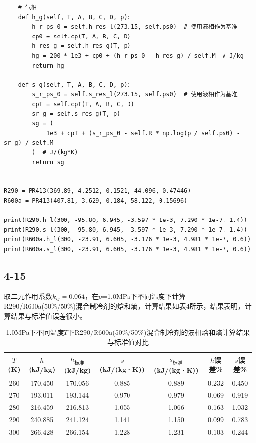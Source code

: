 \documentclass[12pt,a4paper]{article}
\begin{document}
\begin{lstlisting}
    # 气相
    def h_g(self, T, A, B, C, D, p):
        h_r_ps_0 = self.h_res_l(273.15, self.ps0)  # 使用液相作为基准
        cp0 = self.cp(T, A, B, C, D)
        h_res_g = self.h_res_g(T, p)
        hg = 200 * 1e3 + cp0 + (h_r_ps_0 - h_res_g) / self.M  # J/kg
        return hg

    def s_g(self, T, A, B, C, D, p):
        s_r_ps_0 = self.s_res_l(273.15, self.ps0)  # 使用液相作为基准
        cpT = self.cpT(T, A, B, C, D)
        sr_g = self.s_res_g(T, p)
        sg = (
            1e3 + cpT + (s_r_ps_0 - self.R * np.log(p / self.ps0) - sr_g) / self.M
        )  # J/(kg*K)
        return sg


R290 = PR413(369.89, 4.2512, 0.1521, 44.096, 0.47446)
R600a = PR413(407.81, 3.629, 0.184, 58.122, 0.15696)

print(R290.h_l(300, -95.80, 6.945, -3.597 * 1e-3, 7.290 * 1e-7, 1.4))
print(R290.s_l(300, -95.80, 6.945, -3.597 * 1e-3, 7.290 * 1e-7, 1.4))
print(R600a.h_l(300, -23.91, 6.605, -3.176 * 1e-3, 4.981 * 1e-7, 0.6))
print(R600a.s_l(300, -23.91, 6.605, -3.176 * 1e-3, 4.981 * 1e-7, 0.6))
\end{lstlisting}

\subsection*{4-15}
取二元作用系数$k_{ij}=0.064$，在$p$=1.0MPa下不同温度下计算R290/R600a(50\%/50\%)混合制冷剂的焓和熵，计算结果如表4所示，结果表明，计算结果与标准值误差很小。

\begin{table}[h]
\centering
\caption{1.0MPa下不同温度$T$下R290/R600a(50\%/50\%)混合制冷剂的液相焓和熵计算结果与标准值对比}
\begin{tabular}{c c c c c c c}
\hline
$T$ (K) & $h$ (kJ/kg) &$h_\text{标准}$(kJ/kg) & $s$ (kJ/(kg·K)) &$s_\text{标准}$(kJ/(kg·K))& $h$误差\%&$s$误差\%\\
\hline
260 & 170.450& 170.056& 0.885& 0.889& 0.232& 0.450\\
270 & 193.011& 193.144& 0.970& 0.979& 0.069& 0.919\\
280 & 216.459& 216.813& 1.055& 1.066& 0.163& 1.032\\
290 & 240.885& 241.124& 1.141& 1.150& 0.099& 0.783\\
300 & 266.428& 266.154& 1.228& 1.231& 0.103& 0.244\\
\hline
\end{tabular}
\end{table}
\end{document}
